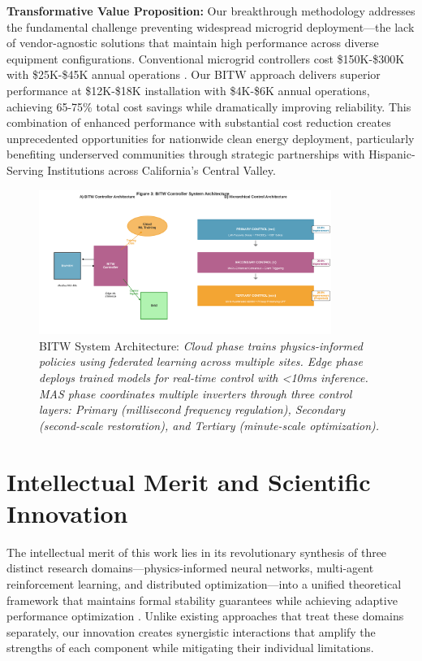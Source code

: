 \documentclass[12pt]{article}
\begin{document}
\textbf{Transformative Value Proposition:} Our breakthrough methodology addresses the fundamental challenge preventing widespread microgrid deployment---the lack of vendor-agnostic solutions that maintain high performance across diverse equipment configurations. Conventional microgrid controllers cost \$150K-\$300K with \$25K-\$45K annual operations \cite{hirsch2018,sigrin2019}. Our BITW approach delivers superior performance at \$12K-\$18K installation with \$4K-\$6K annual operations, achieving 65-75\% total cost savings while dramatically improving reliability. This combination of enhanced performance with substantial cost reduction creates unprecedented opportunities for nationwide clean energy deployment, particularly benefiting underserved communities through strategic partnerships with Hispanic-Serving Institutions across California's Central Valley.

\begin{figure}[H]
\centering
\includegraphics[width=0.85\textwidth]{figure3_system_architecture.pdf}
\caption{BITW System Architecture: \textit{Cloud phase trains physics-informed policies using federated learning across multiple sites. Edge phase deploys trained models for real-time control with <10ms inference. MAS phase coordinates multiple inverters through three control layers: Primary (millisecond frequency regulation), Secondary (second-scale restoration), and Tertiary (minute-scale optimization).}}
\end{figure}

\section{Intellectual Merit and Scientific Innovation}

The intellectual merit of this work lies in its revolutionary synthesis of three distinct research domains---physics-informed neural networks, multi-agent reinforcement learning, and distributed optimization---into a unified theoretical framework that maintains formal stability guarantees while achieving adaptive performance optimization \cite{bevrani2021,palizban2014}. Unlike existing approaches that treat these domains separately, our innovation creates synergistic interactions that amplify the strengths of each component while mitigating their individual limitations.
\end{document}
